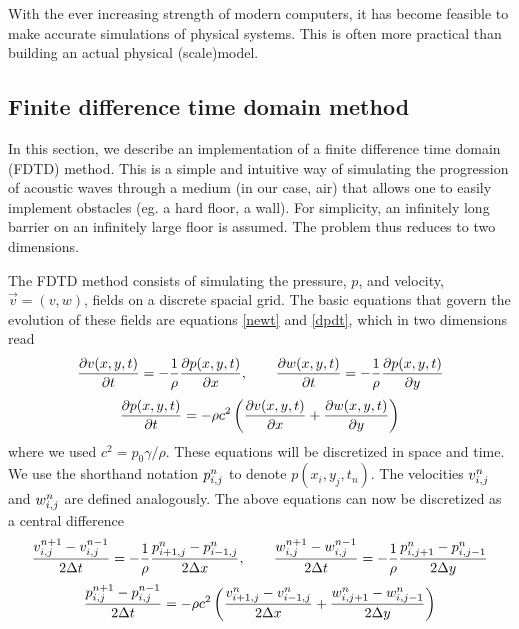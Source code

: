 With the ever increasing strength of modern computers, it has become feasible to make accurate simulations of physical systems. This is often more practical than building an actual physical (scale)model.


\subsection{Finite difference time domain method}
In this section, we describe an implementation of a finite difference time domain (FDTD) method. This is a simple and intuitive way of simulating the progression of acoustic waves through a medium (in our case, air) that allows one to easily implement obstacles (eg. a hard floor, a wall). For simplicity, an infinitely long barrier on an infinitely large floor is assumed. The problem thus reduces to two dimensions.

The FDTD method consists of simulating the pressure, $p$, and velocity, $\vec{v} = (v, w)$, fields on a discrete spacial grid. The basic equations that govern the evolution of these fields are equations \ref{newt} and \ref{dpdt}, which in two dimensions read
$$
\frac{\partial v(x,y,t)}{\partial t} = -\frac{1}{\rho} \frac{\partial p(x,y,t)}{\partial x}
, \qquad
\frac{\partial w(x,y,t)}{\partial t} = -\frac{1}{\rho} \frac{\partial p(x,y,t)}{\partial y}
$$
$$
\frac{\partial p(x,y,t)}{\partial t} = -\rho c^2 \left(\frac{\partial v(x,y,t)}{\partial x} + \frac{\partial w(x,y,t)}{\partial y}\right)
$$
where we used $c^2 = p_0 \gamma / \rho$. These equations will be discretized in space and time. We use the shorthand notation $p_{i,j}^n$ to denote $p(x_i, y_j, t_n)$. The velocities $v_{i,j}^n$ and $w_{i,j}^n$ are defined analogously. The above equations can now be discretized as a central difference
$$
\frac{v_{i,j}^{n+1} - v_{i,j}^{n-1}}{2\Delta t} = -\frac{1}{\rho} \frac{p^n_{i+1,j} - p^n_{i-1,j}}{2\Delta x}
, \qquad
\frac{w_{i,j}^{n+1} - w_{i,j}^{n-1}}{2\Delta t} = -\frac{1}{\rho} \frac{p^n_{i,j+1} - p^n_{i,j-1}}{2\Delta y}
$$
$$
\frac{p_{i,j}^{n+1} - p_{i,j}^{n-1}}{2\Delta t} = 
	-\rho c^2 \left(
		\frac{v^n_{i+1,j} - v^n_{i-1,j}}{2\Delta x}
		+ \frac{w^n_{i,j+1} - w^n_{i,j-1}}{2\Delta y}
	\right)
$$

